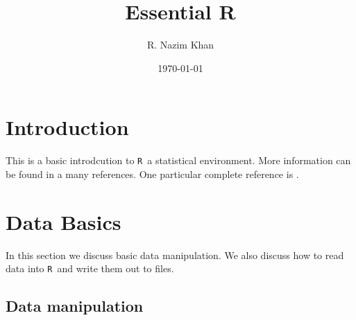 \documentclass[12pt,A4,makeidx]{article}
\title
{Essential R}
\author{R. Nazim Khan}
\date{\today}
\newcommand{\tR}{\texttt{R}}
\begin{document}



\maketitle
\section{Introduction}
This is a basic introdcution to \tR\, a statistical environment. More information can be found in a many references. One particular
complete reference is \cite{rbook}.


\section{Data Basics}
\label{data}
In this section we discuss basic data manipulation. We also discuss how to read data into \tR \ and 
write them out to files.

\subsection{Data manipulation}
\end{document}
